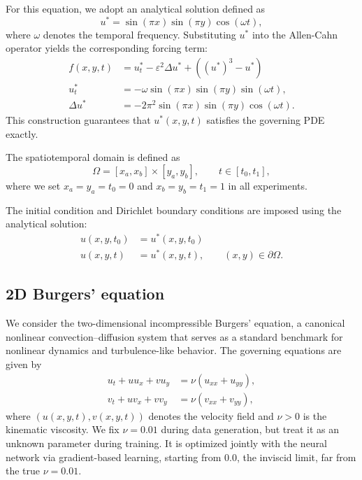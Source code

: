 \documentclass{article}
\theoremstyle{plain}
\theoremstyle{definition}
\theoremstyle{remark}
\begin{document}
For this equation, we adopt an analytical solution defined as
\begin{equation}
u^* = \sin(\pi x) \sin(\pi y) \cos(\omega t),
\end{equation}
where $\omega$ denotes the temporal frequency. Substituting $u^*$ into the Allen-Cahn operator yields the corresponding forcing term:
\begin{align}
f(x,y,t) &= u^*_t - \varepsilon^2 \Delta u^* + ((u^*)^3-u^*)\\
u^*_t &= -\omega \sin(\pi x) \sin(\pi y) \sin(\omega t), \\
\Delta u^* &= -2 \pi^2 \sin(\pi x) \sin(\pi y) \cos(\omega t).
\end{align}
This construction guarantees that $u^*(x,y,t)$ satisfies the governing PDE exactly.

The spatiotemporal domain is defined as
\begin{equation}
    \Omega = [x_a, x_b] \times [y_a, y_b], \qquad t \in [t_0, t_1],
\end{equation}
where we set $x_a = y_a = t_0 = 0$ and $x_b = y_b = t_1 = 1$ in all experiments.

The initial condition and Dirichlet boundary conditions are imposed using the analytical solution:
\begin{align}
    u(x,y,t_0) &= u^*(x,y,t_0) \\
    u(x,y,t) &= u^*(x,y,t), \qquad (x,y) \in \partial \Omega.
\end{align}

\subsection{2D Burgers' equation}

We consider the two-dimensional incompressible Burgers' equation, a canonical nonlinear convection--diffusion system that serves as a standard benchmark for nonlinear dynamics and turbulence-like behavior. The governing equations are given by
\begin{align}
u_t + u u_x + v u_y &= \nu (u_{xx} + u_{yy}), \\
v_t + u v_x + v v_y &= \nu (v_{xx} + v_{yy}),
\end{align}
where $(u(x,y,t), v(x,y,t))$ denotes the velocity field and $\nu > 0$ is the kinematic viscosity. We fix $\nu=0.01$ during data generation, but treat it as an unknown parameter during training. It is optimized jointly with the neural network via gradient-based learning, starting from $0.0$, the inviscid limit, far from the true $\nu=0.01$.
\end{document}
